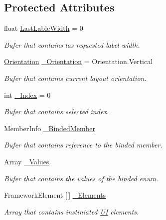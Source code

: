 \subsection*{Protected Attributes}
\begin{DoxyCompactItemize}
\item 
float \mbox{\hyperlink{class_wpf_handler_1_1_u_i_1_1_controls_1_1_flat_toggles_group_ad83c54ae94296233bdebfb1ff14d94cc}{Last\+Lable\+Width}} = 0
\begin{DoxyCompactList}\small\item\em Bufer that contains las requested label width. \end{DoxyCompactList}\item 
\mbox{\hyperlink{class_wpf_handler_1_1_u_i_1_1_controls_1_1_flat_toggles_group_ab0cb4350ceae1f1288d6c83de4ed66c9}{Orientation}} \mbox{\hyperlink{class_wpf_handler_1_1_u_i_1_1_controls_1_1_flat_toggles_group_af7f9d34a746082b32a92ae1cb7e338f2}{\+\_\+\+Orientation}} = Orientation.\+Vertical
\begin{DoxyCompactList}\small\item\em Bufer that contains current layout orientation. \end{DoxyCompactList}\item 
int \mbox{\hyperlink{class_wpf_handler_1_1_u_i_1_1_controls_1_1_flat_toggles_group_a559848ddfbcddd8620d9a7783d2a7d04}{\+\_\+\+Index}} = 0
\begin{DoxyCompactList}\small\item\em Bufer that contains selected index. \end{DoxyCompactList}\item 
Member\+Info \mbox{\hyperlink{class_wpf_handler_1_1_u_i_1_1_controls_1_1_flat_toggles_group_a4c0eac437404a019551b6bfd102cc034}{\+\_\+\+Binded\+Member}}
\begin{DoxyCompactList}\small\item\em Bufer that contains reference to the binded member. \end{DoxyCompactList}\item 
Array \mbox{\hyperlink{class_wpf_handler_1_1_u_i_1_1_controls_1_1_flat_toggles_group_afce8c50c94f3417c807a2ba7cce7970f}{\+\_\+\+Values}}
\begin{DoxyCompactList}\small\item\em Bufer that contains the values of the binded enum. \end{DoxyCompactList}\item 
Framework\+Element \mbox{[}$\,$\mbox{]} \mbox{\hyperlink{class_wpf_handler_1_1_u_i_1_1_controls_1_1_flat_toggles_group_ad8b50e4aed5842fb4b3814a281d6cb31}{\+\_\+\+Elements}}
\begin{DoxyCompactList}\small\item\em Array that contains instiniated \mbox{\hyperlink{namespace_wpf_handler_1_1_u_i}{UI}} elements. \end{DoxyCompactList}\end{DoxyCompactItemize}
